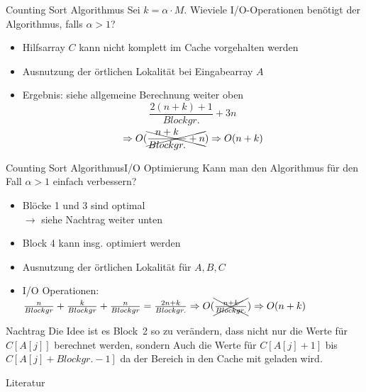 \documentclass[handout]{beamer}
\def \korrekturfarbe {blue}
\begin{document}
\begin{frame}{Counting Sort Algorithmus}
  Sei $k = \alpha \cdot M$. Wieviele I/O-Operationen benötigt der Algorithmus, falls $\alpha > 1$?
  \begin{itemize}
    \item Hilfsarray $C$ kann nicht komplett im Cache vorgehalten werden
    \item Ausnutzung der örtlichen Lokalität bei Eingabearray $A$
    \item Ergebnis: siehe allgemeine Berechnung weiter oben
    \begin{equation*}
    \frac{2(n+k)+1}{Blockgr.}+3n
    \end{equation*}
    \begin{equation*}
    \Rightarrow O(\xcancel{\frac{n+k}{Blockgr.}+n}) \Rightarrow O(n + k)
    \end{equation*}
  \end{itemize}
\end{frame}

\begin{frame}[fragile]{Counting Sort Algorithmus}{I/O Optimierung}
  Kann man den Algorithmus für den Fall $\alpha > 1$ einfach verbessern?
  \begin{itemize}
    \item<1-> Blöcke  1 und 3 sind optimal \\
    {\color{\korrekturfarbe} $\rightarrow$ siehe Nachtrag weiter unten}
    \item<1-> Block 4 kann insg. optimiert werden
    \item<3> Ausnutzung der örtlichen Lokalität für $A, B, C$
    \item<3> I/O Operationen: $\frac{n}{Blockgr} + \frac{k}{Blockgr} + \frac{n}{Blockgr} = \frac{2n+k}{Blockgr.} \Rightarrow O(\xcancel{\frac{n+k}{Blockgr.}}) \Rightarrow O(n + k)$
  \end{itemize}

  \begin{semiverbatim}
  \end{semiverbatim}
\end{frame}

\begin{frame}{Nachtrag}
  Die Idee ist es Block~2 so zu verändern, dass nicht nur die Werte für $C[A[j]]$ berechnet werden, sondern Auch die Werte für $C[A[j] + 1]$ bis $C[A[j] + Blockgr. -1]$ da der Bereich in den Cache mit geladen wird.
\end{frame}

\begin{frame}{Literatur}
  
  
\end{frame}
\end{document}
